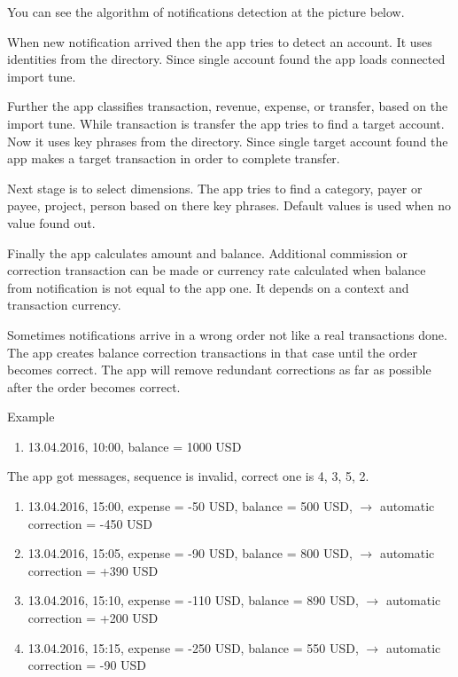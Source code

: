 \documentclass[a4paper,10pt,english]{sphinxmanual}
\begin{document}
You can see the algorithm of notifications detection at the picture below.


When new notification arrived then the app tries to detect an account. It uses identities from the
 directory. Since single account found the app loads connected import tune.

Further the app classifies transaction, revenue, expense, or transfer, based on the import tune.
While transaction is transfer the app tries to find a target account. Now it uses key phrases from the
 directory. Since single target account found the app makes a target transaction
in order to complete transfer.

Next stage is to select dimensions. The app tries to find a category, payer or payee, project, person
based on there key phrases. Default values is used when no value found out.

Finally the app calculates amount and balance. Additional commission or correction
transaction can be made or currency rate calculated when balance from notification is not equal to the app one.
It depends on a context and transaction currency.

Sometimes notifications arrive in a wrong order not like a real transactions done. The app
creates balance correction transactions in that case until the order becomes correct.
The app will remove redundant corrections as far as possible after the order becomes correct.

Example
\begin{enumerate}
\def\theenumi{\arabic{enumi}}
\def\labelenumi{\theenumi .}
\makeatletter\def\p@enumii{\p@enumi \theenumi .}\makeatother
\item {} 
13.04.2016, 10:00, balance = 1000 USD

\end{enumerate}

The app got messages, sequence is invalid, correct one is 4, 3, 5, 2.
\begin{enumerate}
\def\theenumi{\arabic{enumi}}
\def\labelenumi{\theenumi .}
\makeatletter\def\p@enumii{\p@enumi \theenumi .}\makeatother
\setcounter{enumi}{1}
\item {} 
13.04.2016, 15:00, expense = -50 USD, balance = 500 USD, \(\rightarrow\) automatic correction = -450 USD

\item {} 
13.04.2016, 15:05, expense = -90 USD, balance = 800 USD, \(\rightarrow\) automatic correction = +390 USD

\item {} 
13.04.2016, 15:10, expense = -110 USD, balance = 890 USD, \(\rightarrow\) automatic correction = +200 USD

\item {} 
13.04.2016, 15:15, expense = -250 USD, balance = 550 USD, \(\rightarrow\) automatic correction = -90 USD

\end{enumerate}
\end{document}
